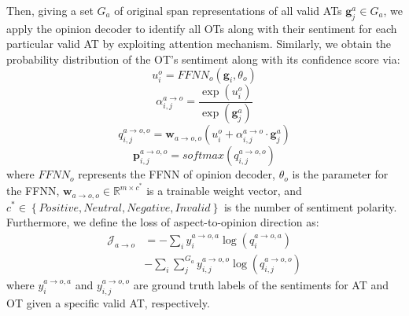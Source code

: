 \documentclass[11pt]{article}
\begin{document}
Then, giving a set $G_{a}$ of original span representations of all valid ATs $\mathbf{g}^{a}_{j}\in G_{a}$, we apply the opinion decoder to identify all OTs along with their sentiment for each particular valid AT by exploiting attention mechanism. Similarly, we obtain the probability distribution of the OT's sentiment along with its confidence score via:
\begin{equation} \label{opinion FFN}
	u^{o}_{i}=FFNN_{o}\left(\mathbf{g}_{i}, \theta_{o}\right)
\end{equation}
\begin{equation} 			
	\alpha^{a\rightarrow o}_{i,j}=\frac{\exp(u^{o}_{i})} {\exp(\mathbf{g}^{a}_{j})}
\end{equation}
\begin{equation}
	q^{a\rightarrow o, o}_{i,j}=\mathbf{w}_{a\rightarrow o,o}\left(u^{o}_{i} + \alpha^{a\rightarrow o}_{i,j} \cdot \mathbf{g}^{a}_{j} \right)
\end{equation}
\begin{equation}
	\mathbf{p}^{a\rightarrow o, o}_{i,j}=softmax(q^{a\rightarrow o, o}_{i,j})
\end{equation}
where $FFNN_{o}$ represents the FFNN of opinion decoder, $\theta_{o}$ is the parameter for the FFNN, $\mathbf{w}_{a\rightarrow o,o}\in\mathbb{R}^{m\times c^{*}}$ is a trainable weight vector, and $c^{*}\in\left\{Positive,Neutral,Negative,Invalid\right\}$ is the number of sentiment polarity. Furthermore, we define the loss of aspect-to-opinion direction as:
\begin{equation}
	\begin{split}
		\mathcal{J}_{a\rightarrow o}&=-\sum_{i} y^{a\rightarrow o,a}_{i} \log\left(q^{a\rightarrow o,a}_{i}\right) \\ &- \sum_{i} \sum_{j}^{G_{a}} y^{a\rightarrow o,o}_{i,j} \log\left(q^{a\rightarrow o,o}_{i, j}\right)
	\end{split}
\end{equation}
where $y^{a\rightarrow o,a}_{i}$ and $y^{a\rightarrow o,o}_{i,j}$ are ground truth labels of the sentiments for AT and OT given a specific valid AT, respectively.
\end{document}
